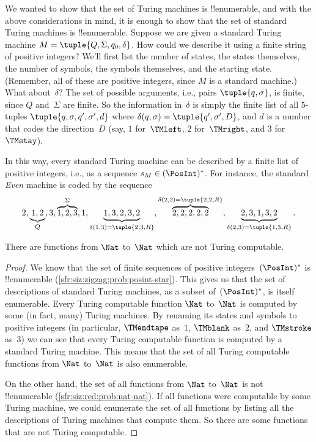 \documentclass[../../../include/open-logic-section]{subfiles}
\begin{document}
\begin{explain}
We wanted to show that the set of Turing machines is !!{enumerable},
and with the above considerations in mind, it is enough to show that
the set of standard Turing machines is !!{enumerable}. Suppose we are
given a standard Turing machine $M = \tuple{Q, \Sigma, q_0, \delta}$.
How could we describe it using a finite string of positive integers?
We'll first list the number of states, the states themselves, the
number of symbols, the symbols themselves, and the starting state.
(Remember, all of these are positive integers, since $M$ is a standard
machine.)  What about~$\delta$? The set of possible arguments, i.e.,
pairs $\tuple{q,\sigma}$, is finite, since $Q$ and~$\Sigma$ are
finite. So the information in~$\delta$ is simply the finite list of
all $5$-tuples $\tuple{q, \sigma, q', \sigma', d}$ where
$\delta(q,\sigma) = \tuple{q', \sigma', D}$, and $d$ is a number that
codes the direction~$D$ (say, $1$ for~$\TMleft$, $2$ for~$\TMright$,
and $3$ for~$\TMstay$).

In this way, every standard Turing machine can be described by a
finite list of positive integers, i.e., as a sequence $s_M \in
(\PosInt)^*$. For instance, the standard \emph{Even} machine is coded
by the sequence
\[
2, \underbrace{1, 2}_Q, 3, \overbrace{1, 2, 3}^\Sigma, 1, \underbrace{1, 3, 2, 3, 2}_{\delta(1,3) = \tuple{2,3,R}}, 
\overbrace{2, 2, 2, 2, 2}^{\delta(2,2) = \tuple{2,2,R}},
\underbrace{2, 3, 1, 3, 2}_{\delta(2,3) = \tuple{1,3,R}}.
\]
\end{explain}

\begin{thm}
There are functions from $\Nat$ to~$\Nat$ which are not Turing
computable.
\end{thm}

\begin{proof}
We know that the set of finite sequences of positive
integers~$(\PosInt)^*$ is !!{enumerable}
(\cref{sfr:siz:zigzag:prob:posint-star}). This gives us that the set
of descriptions of standard Turing machines, as a subset
of~$(\PosInt)^*$, is itself enumerable.  Every Turing computable
function $\Nat$ to~$\Nat$ is computed by some (in fact, many) Turing
machines. By renaming its states and symbols to positive integers (in
particular, $\TMendtape$ as~$1$, $\TMblank$ as~$2$, and $\TMstroke$
as~$3$) we can see that every Turing computable function is computed
by a standard Turing machine. This means that the set of all Turing
computable functions from $\Nat$ to~$\Nat$ is also enumerable.

On the other hand, the set of all functions from $\Nat$ to~$\Nat$ is
not !!{enumerable} (\cref{sfr:siz:red:prob:nat-nat}). If all functions
were computable by some Turing machine, we could enumerate the set of
all functions by listing all the descriptions of Turing machines that
compute them. So there are some functions that are not Turing
computable. 
\end{proof}
\end{document}
